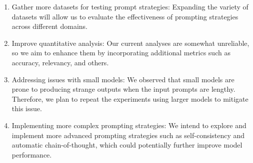 \documentclass[fleqn,moreauthors,10pt]{ds_report}
\begin{document}
\begin{enumerate}
    \item Gather more datasets for testing prompt strategies: Expanding the variety of datasets will allow us to evaluate the effectiveness of prompting strategies across different domains.
    
    \item Improve quantitative analysis: Our current analyses are somewhat unreliable, so we aim to enhance them by incorporating additional metrics such as accuracy, relevancy, and others.
    
    \item Addressing issues with small models: We observed that small models are prone to producing strange outputs when the input prompts are lengthy. Therefore, we plan to repeat the experiments using larger models to mitigate this issue.
    
    \item Implementing more complex prompting strategies: We intend to explore and implement more advanced prompting strategies such as self-consistency and automatic chain-of-thought, which could potentially further improve model performance.
\end{enumerate}
\end{document}
